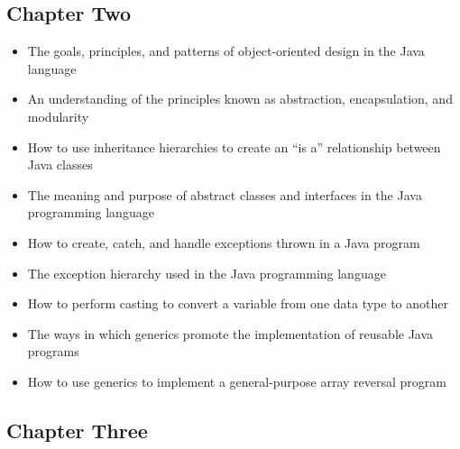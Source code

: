 \documentclass[11pt]{article}
\begin{document}
\vspace*{-.2in}
\subsection*{Chapter Two}

\begin{itemize}


  \item The goals, principles, and patterns of object-oriented design in the
    Java language

  \item An understanding of the principles known as abstraction, encapsulation,
    and modularity

  \item How to use inheritance hierarchies to create an ``is a'' relationship
    between Java classes

  \item The meaning and purpose of abstract classes and interfaces in the Java
    programming language

  \item How to create, catch, and handle exceptions thrown in a Java program

  \item The exception hierarchy used in the Java programming language

  \item How to perform casting to convert a variable from one data type to
    another

  \item The ways in which generics promote the implementation of reusable Java
    programs

  \item How to use generics to implement a general-purpose array reversal
    program

\end{itemize}

\vspace*{-.2in}
\subsection*{Chapter Three}
\end{document}
